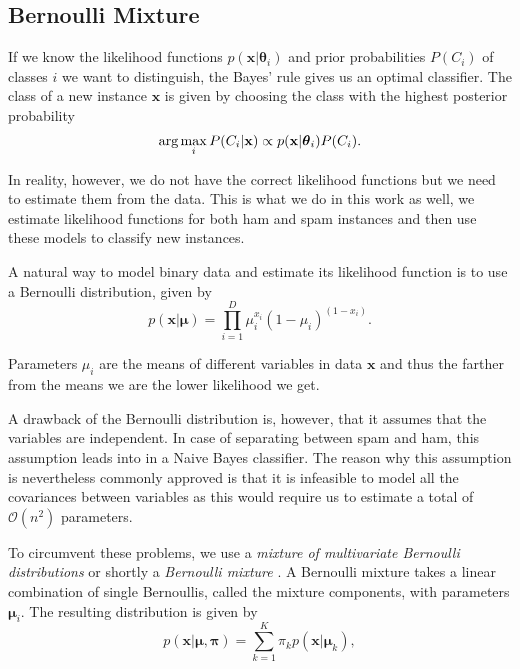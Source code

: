 \subsection{Bernoulli Mixture}

If we know the likelihood functions $p(\mathbf{x}|\boldsymbol\theta_i)$
and prior probabilities $P(C_i)$ of classes $i$ we want to distinguish,
the Bayes' rule gives us an optimal classifier. The class of a new
instance $\mathbf{x}$ is given by choosing the class with the highest
posterior probability
\begin{equation}
 \textmd{arg}\max_i P(C_i|\mathbf{x}) \propto p(\mathbf{x}|\boldsymbol\theta_i)P(C_i).
\end{equation}

In reality, however, we do not have the correct likelihood functions but
we need to estimate them from the data. This is what we do in this work
as well, we estimate likelihood functions for both ham and spam
instances and then use these models to classify new instances.

A natural way to model binary data and estimate its likelihood function
is to use a Bernoulli distribution, given by
\begin{equation}
  p(\mathbf{x}|\boldsymbol\mu) = \prod_{i=1}^D \mu_i^{x_i}(1-\mu_i)^{(1-x_i)}.
\end{equation}

Parameters $\mu_i$ are the means of different variables in data
$\mathbf{x}$ and thus the farther from the means we are the lower
likelihood we get.

A drawback of the Bernoulli distribution is, however, that it assumes
that the variables are independent. In case of separating between spam
and ham, this assumption leads into in a Naive Bayes classifier. The
reason why this assumption is nevertheless commonly approved is that it
is infeasible to model all the covariances between variables as this
would require us to estimate a total of $\mathcal{O}(n^2)$ parameters.

To circumvent these problems, we use a
\emph{mixture of multivariate Bernoulli distributions} or shortly a
\emph{Bernoulli mixture} \cite{lazarsfeld1968latent}. A Bernoulli
mixture takes a linear combination of single Bernoullis, called the
mixture components, with parameters $\boldsymbol\mu_i$. The resulting
distribution is given by
\begin{equation}
 p(\mathbf{x}|\boldsymbol\mu,\boldsymbol\pi) = \sum_{k=1}^K \pi_kp(\mathbf{x}|\boldsymbol\mu_k),
\end{equation}

